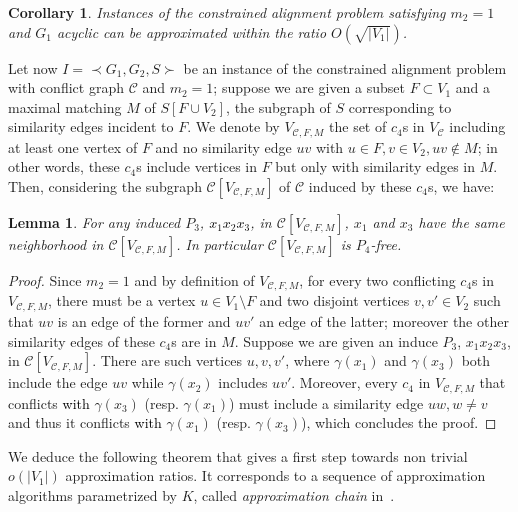 \documentclass[final]{dmtcs-episciences}
\newtheorem{lemma}[theorem]{Lemma}
\newtheorem{corollary}[theorem]{Corollary}
\newcommand\mar[1]{\textcolor{black}{#1}}
\begin{document}
\begin{corollary}\label{cor: approxacyclic}
Instances of the constrained alignment problem satisfying $m_2=1$ and $G_1$ acyclic can be approximated within the ratio $O(\sqrt{|V_1|})$.
\end{corollary}



Let now $I=\prec G_1,G_2,S \succ$ be an instance of the constrained alignment problem with conflict graph $\mathcal{C}$ and $m_2=1$; suppose we are given a subset $F\subset V_1$ and a maximal matching $M$ of $S[F\cup V_2]$, the subgraph of $S$ corresponding to similarity edges incident to $F$. We denote by $V_{\mathcal{C},F,M}$ the set of $c_4$s in $V_{\mathcal{C}}$  including at least one vertex of $F$ and no similarity edge $uv$ with $u\in F, v\in V_2, uv\notin M$; in other words, these $c_4$s include vertices in $F$ but only with similarity edges in $M$. Then, considering the subgraph $\mathcal{C}[V_{\mathcal{C},F,M}]$ of $\mathcal{C}$ induced by these $c_4$s, we have: 

\begin{lemma}\label{lem:P_4-new}
For any induced $P_3$, \mar{$x_1x_2x_3$}, in $\mathcal{C}[V_{\mathcal{C},F,M}]$, $x_1$ and $x_3$ have the same neighborhood  in $\mathcal{C}[V_{\mathcal{C},F,M}]$. In particular $\mathcal{C}[V_{\mathcal{C},F,M}]$ is $P_4$-free.
\end{lemma}

\begin{proof}
 Since $m_2=1$ and by definition of $V_{\mathcal{C},F,M}$, for every two conflicting $c_4$s in $V_{\mathcal{C},F,M}$, there must be   a vertex $u\in V_1\setminus  F$ and two disjoint vertices $v,v'\in V_2$ such that $uv$ is an edge of the former and $uv'$ an edge of the latter; moreover the other similarity edges of these $c_4$s are in $M$. Suppose we are given an induce $P_3$, $x_1x_2x_3$, in 
 $\mathcal{C}[V_{\mathcal{C},F,M}]$. There are such vertices $u,v,v'$, where $\gamma(x_1)$ and $\gamma(x_3)$ both include the edge $uv$ while $\gamma(x_2)$ includes $uv'$. Moreover, every $c_4$ in $V_{\mathcal{C},F,M}$  that conflicts  \mar{with} $\gamma(x_3)$ (resp. $\gamma(x_1)$) must include a similarity  edge $uw, w\neq v$ and thus it conflicts \mar{with} $\gamma(x_1)$ (resp. $\gamma(x_3)$), which concludes the proof.\end{proof}

We deduce the following theorem that gives a first step towards non trivial $o(|V_1|)$ approximation ratios. It corresponds to a sequence of approximation algorithms parametrized by $K$, called {\em approximation chain} in~\citet{demange-chain}.
\end{document}
